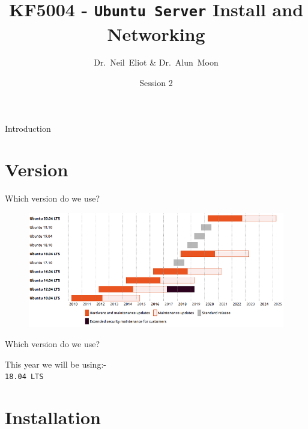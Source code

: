 \documentclass{beamer}
\title{KF5004 - \texttt{Ubuntu Server} Install and Networking}
\author{Dr.~Neil~Eliot \& Dr.~Alun~Moon}
\institute[Northumbria University] %
{
  Department of Computer and Information Sciences\\
  University of Northumbria
}
\date{Session 2}
\begin{document}
\begin{frame}
  \titlepage
\end{frame}

\begin{frame}{Introduction}
  \tableofcontents
\end{frame}

\section{Version}
\begin{frame}{Which version do we use?}
  \begin{figure}
    \begin{center}
      \includegraphics[width=1\linewidth]{Version.png}
    \end{center}
  \end{figure}
\end{frame}

\begin{frame}{Which version do we use?}
  \begin{center}
    \LARGE This year we will be using:-\\
    \Huge \texttt{18.04 LTS}
  \end{center}
\end{frame}

\section{Installation}
\end{document}
